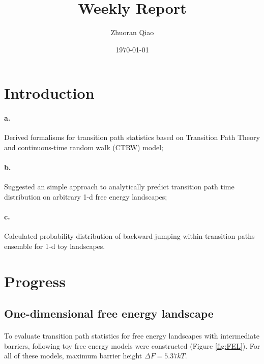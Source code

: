\documentclass[11pt, a4paper]{article}
\begin{document}
\title{Weekly Report}
\author{Zhuoran Qiao}
\date{\today}

\maketitle

\section{Introduction}
\paragraph{a.} Derived formalisms for transition path statistics based on Transition Path Theory and continuous-time random walk (CTRW) model;
\paragraph{b.} Suggested an simple approach to analytically predict transition path time distribution on arbitrary 1-d free energy landscapes;
\paragraph{c.} Calculated probability distribution of backward jumping within transition paths ensemble for 1-d toy landscapes.

\section{Progress}
\subsection{One-dimensional free energy landscape}

\paragraph{}To evaluate transition path statistics for free energy landscapes with intermediate barriers,
 following toy free energy models were constructed (Figure \ref{fig:FEL}). For all of these models, maximum barrier height $\Delta F=5.37kT$.
\end{document}
